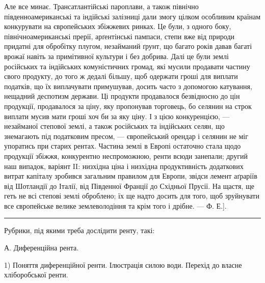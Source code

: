 Але все минає. Трансатлантійські пароплави, а також північно південноамериканські
та індійські залізниці дали змогу цілком особливим країнам конкурувати
на європейських збіжжевих ринках. Це були, з одного боку, північноамериканські
прерії, арґентінські пампаси, степи вже від природи придатні для
обробітку плугом, незайманий ґрунт, що багато років давав багаті врожаї навіть
за примітивної культури і без добрива. Далі це були землі російських та
індійських комуністичних громад, які мусили продавати частину свого продукту,
до того ж дедалі більшу, щоб одержати гроші для виплати податків, що їх виплачувати
примушував, досить часто з допомогою катування, нещадний деспотизм
держави. Ці продукти продавалося безвідносно до цін продукції, продавалося
за ціну, яку пропонував торговець, бо селянин на строк виплати мусив
мати гроші хоч би за яку ціну. І з цією конкуренцією, — незайманої степової
землі, а також російських та індійських селян, що знемагають під податковим пресом,
— європейський орендар і селянин не міг упоратись при старих рентах. Частина
землі в Европі остаточно стала щодо продукції збіжжя, конкурентно неспроможною,
ренти всюди занепали; другий наш випадок, варіянт II: низхідна ціна
і низхідна продуктивність додаткових витрат капіталу зробився загальним
правилом для Европи, звідси лемент аґраріїв від Шотландії до Італії, від Південної
Франції до Східньої Прусії. На щастя, ще геть не всі степові землі
оброблено; їх ще надто досить для того, щоб зруйнувати все європейське велике
землеволодіння та крім того і дрібне. — Ф. Е.].

\pfbreak

Рубрики, під якими треба дослідити ренту, такі:

А. Диференційна рента.

1) Поняття диференційної ренти. Ілюстрація силою води. Перехід до власне
хліборобської ренти.
\parbreak{}  %
